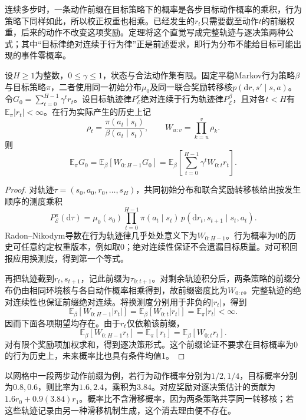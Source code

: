 连续多步时，一条动作前缀在目标策略下的概率是各步目标动作概率的乘积，行为策略下同样如此，所以校正权重也相乘。已经发生的$r_t$只需要截至动作$t$的前缀权重，后来的动作不改变这项奖励。定理将这个直觉写成完整轨迹与逐决策两种公式；其中“目标律绝对连续于行为律”正是前述要求，即行为分布不能给目标可能出现的事件零概率。

\begin{theorem}[轨迹与逐决策重要性校正]
  \label{thm:rl-learning-importance-sampling}
  设$H\geq1$为整数，$0\leq\gamma\leq1$，状态与合法动作集有限。固定平稳Markov行为策略$\beta$与目标策略$\pi$，二者使用同一初始分布$\mu_0$及同一联合奖励转移核$p(\mathrm dr,s'\mid s,a)$。令$G_0=\sum_{t=0}^{H-1}\gamma^t r_t$。设目标轨迹律$P_{\mathcal E}^{\pi}$绝对连续于行为轨迹律$P_{\mathcal E}^{\beta}$，且对各$t<H$有$\mathbb E_\pi|r_t|<\infty$。在行为实际产生的历史上记
  \[
    \rho_t=\frac{\pi(a_t\mid s_t)}{\beta(a_t\mid s_t)},\qquad
    W_{u:v}=\prod_{k=u}^{v}\rho_k .
  \]
  则
  \begin{equation}
    \mathbb E_\pi G_0
       =\mathbb E_\beta[W_{0:H-1}G_0]
       =\mathbb E_\beta\left[\sum_{t=0}^{H-1}
                           \gamma^t W_{0:t}r_t\right].
    \label{eq:rl-learning-is}
  \end{equation}
\end{theorem}
\begin{proof}
  对轨迹$\tau=(s_0,a_0,r_0,\ldots,s_H)$，共同初始分布和联合奖励转移核给出按发生顺序的测度乘积
  \[
    P_{\mathcal E}^{\pi}(\mathrm d\tau)
      =\mu_0(s_0)\prod_{t=0}^{H-1}
        \pi(a_t\mid s_t)\,p(\mathrm dr_t,s_{t+1}\mid s_t,a_t).
  \]
  Radon--Nikodym导数在行为轨迹律几乎处处意义下为$W_{0:H-1}$。行为概率为0的历史可任意约定权重版本，例如取0；绝对连续性保证不会遗漏目标质量。对可积回报应用换测度，得到第一个等式。

  再把轨迹截到$r_t,s_{t+1}$，记此前缀为$\tau_{0:t+1}$。对剩余轨迹积分后，两条策略的前缀分布仍由相同环境核与各自动作概率相乘得到，故前缀密度比为$W_{0:t}$。完整轨迹的绝对连续性也保证前缀绝对连续。将换测度分别用于非负的$|r_t|$，得到
  \[
    \mathbb E_\beta[W_{0:H-1}|r_t|]
    =\mathbb E_\beta[W_{0:t}|r_t|]
    =\mathbb E_\pi|r_t|<\infty.
  \]
  因而下面各项期望均存在。由于$r_t$仅依赖该前缀，
  \[
    \mathbb E_\beta[W_{0:H-1}r_t]
    =\mathbb E_\pi[r_t]
    =\mathbb E_\beta[W_{0:t}r_t].
  \]
  对有限个奖励项加权求和，得到逐决策形式。这个前缀论证不要求在目标概率为0的行为历史上，未来概率比也具有条件均值1。
\end{proof}

以网格中一段两步动作前缀为例，若行为动作概率分别为$1/2,1/4$，目标概率分别为$0.8,0.6$，则比率为$1.6,2.4$，乘积为$3.84$。对应奖励对逐决策估计的贡献为$1.6r_0+0.9(3.84)r_1$。概率比不含滑移概率，因为两条策略共享同一转移核；若这些轨迹记录由另一种滑移机制生成，这个消去理由便不存在。

